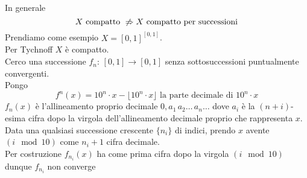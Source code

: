 \spazio
\begin{oss}In generale
$$ X \text{ compatto } \not \Rightarrow X \text{ compatto per successioni}$$
Prendiamo come esempio $X=[0,1]^{[0,1]}$.\\
Per Tychnoff $X$ \`e compatto.\\
Cerco una successione $f_n:\, [0,1]\to [0,1]$ senza sottosuccessioni puntualmente convergenti.\\
Pongo
$$ f^n(x)= 10^n \cdot x - \lfloor 10^n \cdot x \rfloor \text{ la parte decimale di } 10^n \cdot x $$
$f_n(x)$ \`e l'allineamento proprio decimale $0,a_1\, a_2 \dots \, a_n \dots $ dove $a_i$ \`e la $(n+i)$-esima cifra dopo la virgola dell'allineamento decimale proprio che rappresenta $x$.\\
Data una qualsiasi successione crescente $\{ n_i\}$ di indici, prendo $x$ avente $( i \mod 10)$ come $n_i+1$ cifra decimale.\\
Per costruzione $f_{n_i}(x)$ ha come prima cifra dopo la virgola $(i \mod 10)$ dunque $f_{n_i}$ non converge
\end{oss}
